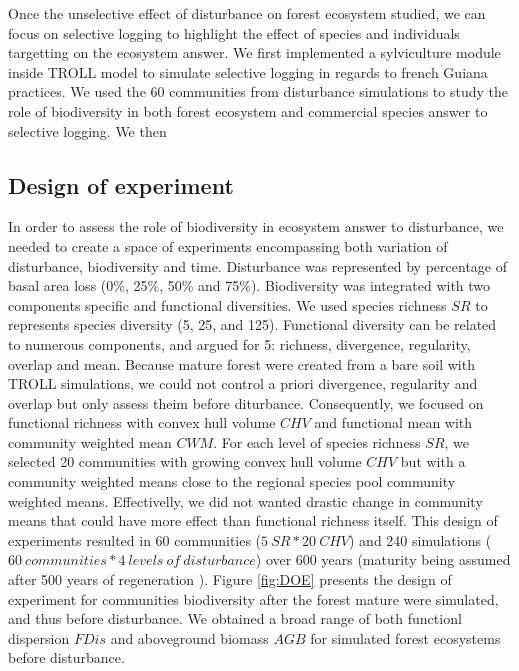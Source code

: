\documentclass[12pt,]{article}
\theoremstyle{definition}
\theoremstyle{definition}
\theoremstyle{remark}
\begin{document}
Once the unselective effect of disturbance on forest ecosystem studied,
we can focus on selective logging to highlight the effect of species and
individuals targetting on the ecosystem answer. We first implemented a
sylviculture module inside TROLL model to simulate selective logging in
regards to french Guiana practices. We used the 60 communities from
disturbance simulations to study the role of biodiversity in both forest
ecosystem and commercial species answer to selective logging. We then

\subsection{Design of experiment}\label{design-of-experiment}

In order to assess the role of biodiversity in ecosystem answer to
disturbance, we needed to create a space of experiments encompassing
both variation of disturbance, biodiversity and time. Disturbance was
represented by percentage of basal area loss (0\%, 25\%, 50\% and 75\%).
Biodiversity was integrated with two components specific and functional
diversities. We used species richness \(SR\) to represents species
diversity (5, 25, and 125). Functional diversity can be related to
numerous components, and \citet{Borgy2017} argued for 5: richness,
divergence, regularity, overlap and mean. Because mature forest were
created from a bare soil with TROLL simulations, we could not control a
priori divergence, regularity and overlap but only assess theim before
diturbance. Consequently, we focused on functional richness with convex
hull volume \(CHV\) and functional mean with community weighted mean
\(CWM\). For each level of species richness \(SR\), we selected 20
communities with growing convex hull volume \(CHV\) but with a community
weighted means close to the regional species pool community weighted
means. Effectivelly, we did not wanted drastic change in community means
that could have more effect than functional richness itself. This design
of experiments resulted in 60 communities (\(5~SR*20~CHV\)) and 240
simulations (\(60 ~communities*4~levels~of~disturbance\)) over 600 years
(maturity being assumed after 500 years of regeneration \citep{Li}).
Figure \ref{fig:DOE} presents the design of experiment for communities
biodiversity after the forest mature were simulated, and thus before
disturbance. We obtained a broad range of both functionl dispersion
\(FDis\) and aboveground biomass \(AGB\) for simulated forest ecosystems
before disturbance.
\end{document}
